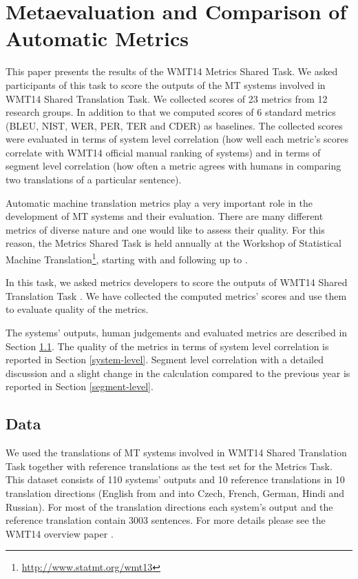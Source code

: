 \chapter{Metaevaluation and Comparison of Automatic Metrics}

This paper presents the results of the WMT14 Metrics Shared Task. We asked
participants of this task to score the outputs of the MT systems involved in
WMT14 Shared Translation Task. We collected scores of 23 metrics from 12
research groups. In addition to that we computed scores of 6 standard metrics
(BLEU, NIST, WER, PER, TER and CDER) as baselines. The collected scores were
evaluated in terms of system level correlation (how well each metric's scores
correlate with WMT14 official manual ranking of systems) and in terms of
segment level correlation (how often a metric agrees with humans in comparing
two translations of a particular sentence).

Automatic machine translation metrics play a very important role in the
development of MT systems and their evaluation. There are many different
metrics of diverse nature and one would like to assess their quality. For this
reason, the Metrics Shared Task is held annually at the Workshop of Statistical
Machine Translation\footnote{\url{http://www.statmt.org/wmt13}}, starting with
 and following up to
.

In this task, we asked metrics developers to score the outputs of WMT14 Shared
Translation Task . We have collected the computed
metrics' scores and use them to evaluate quality of the metrics. 

The systems' outputs, human judgements and evaluated metrics are described in
Section \ref{section:data}. The quality of the metrics in terms of system level
correlation is reported in Section \ref{system-level}. Segment level
correlation with a detailed discussion and a slight change in the calculation
compared to the previous year is reported in Section \ref{segment-level}.

\section{Data}
\label{section:data}

We used the translations of MT systems involved in WMT14 Shared Translation
Task together with reference translations as the test set for the Metrics Task.
This dataset consists of 110 systems' outputs and 10 reference translations in
10 translation directions (English from and into Czech, French, German, Hindi
and Russian). For most of
the translation directions each system's output and the reference translation
contain 3003 sentences. For more details please see the WMT14 overview
paper . 

